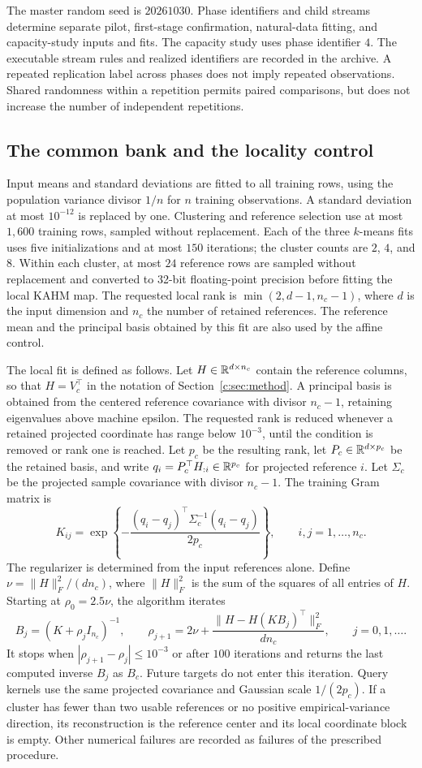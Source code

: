The master random seed is $20261030$. Phase identifiers and child streams
determine separate pilot, first-stage confirmation, natural-data fitting,
and capacity-study inputs and fits. The capacity study uses phase
identifier $4$. The executable stream rules and realized identifiers
are recorded in the archive. A repeated replication label across
phases does not imply repeated observations. Shared randomness within
a repetition permits paired comparisons, but does not increase the
number of independent repetitions.

\subsection{The common bank and the locality control}

Input means and standard deviations are fitted to all training rows,
using the population variance divisor $1/n$ for $n$ training observations.
A standard deviation at most $10^{-12}$ is replaced by one. Clustering
and reference selection use at most $1{,}600$ training rows, sampled
without replacement. Each of the three $k$-means fits uses five
initializations and at most $150$ iterations; the cluster counts are
$2$, $4$, and $8$. Within each cluster, at most $24$ reference rows are
sampled without replacement and converted to 32-bit floating-point
precision before fitting the local KAHM map. The requested local rank
is $\min(2,d-1,n_c-1)$, where $d$ is the input dimension and $n_c$
the number of retained references. The reference mean and the principal
basis obtained by this fit are also used by the affine control.

The local fit is defined as follows. Let
$H\in\mathbb{R}^{d\times n_c}$ contain the reference columns, so that
$H=V_c^\top$ in the notation of Section~\ref{c:sec:method}.
A principal basis is obtained from the centered reference covariance
with divisor $n_c-1$, retaining eigenvalues above machine epsilon.
The requested rank is reduced whenever a retained projected coordinate
has range below $10^{-3}$, until the condition is removed or rank one
is reached. Let $p_c$ be the resulting rank, let
$P_c\in\mathbb{R}^{d\times p_c}$ be the retained basis, and write
$q_i=P_c^\top H_{:i}\in\mathbb{R}^{p_c}$ for projected reference $i$.
Let $\Sigma_c$ be the projected sample covariance with divisor $n_c-1$.
The training Gram matrix is
\[
 K_{ij}=\exp\left\{-\frac{
 (q_i-q_j)^\top\Sigma_c^{-1}(q_i-q_j)}{2p_c}\right\},
 \qquad i,j=1,\ldots,n_c.
\]
The regularizer is determined from the input references alone. Define
$\nu=\|H\|_F^2/(dn_c)$, where $\|H\|_F^2$ is the sum of the squares
of all entries of $H$. Starting at $\rho_0=2.5\nu$, the algorithm
iterates
\[
 B_j=(K+\rho_jI_{n_c})^{-1},\qquad
 \rho_{j+1}=2\nu+
 \frac{\|H-H(KB_j)^\top\|_F^2}{dn_c},\qquad j=0,1,\ldots.
\]
It stops when $|\rho_{j+1}-\rho_j|\leq10^{-3}$ or after $100$
iterations and returns the last computed inverse $B_j$ as $B_c$.
Future targets do not enter this iteration. Query kernels use the
same projected covariance and Gaussian scale $1/(2p_c)$.
If a cluster has fewer than two usable references or no positive
empirical-variance direction, its reconstruction is the reference
center and its local coordinate block is empty. Other numerical
failures are recorded as failures of the prescribed procedure.

